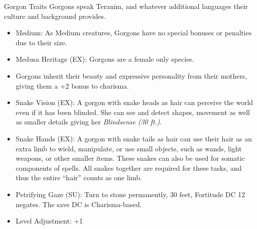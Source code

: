 
\begin{35e}{Gorgon Traits}
  Gorgons speak Teranim, and whatever additional languages their culture and
  background provides.

  \begin{itemize}[noitemsep]
    \item Medium: As Medium creatures, Gorgons have no special bonuses or
      penalties due to their size.
    \item Medusa Heritage (EX): Gorgons are a female only species.
    \item Gorgons inherit their beauty and expressive personality from their
      mothers, giving them a +2 bonus to charisma.
    \item Snake Vision (EX): A gorgon with snake heads as hair can perceive
      the world even if it has been blinded. She can see and detect shapes,
      movement as well as smaller details giving her \emph{Blindsense (30
        ft.)}.
    \item Snake Hands (EX): A gorgon with snake tails as hair can use their
      hair as an extra limb to wield, manipulate, or use small objects, such
      as wands, light weapons, or other smaller items. These snakes can also
      be used for somatic components of spells. All snakes together are
      required for these tasks, and thus the entire ``hair'' counts as one
      limb.
    \item Petrifying Gaze (SU): Turn to stone permanently, 30 feet, Fortitude
      DC 12 negates. The save DC is Charisma-based.
    \item Level Adjustment: +1
  \end{itemize}
\end{35e}
